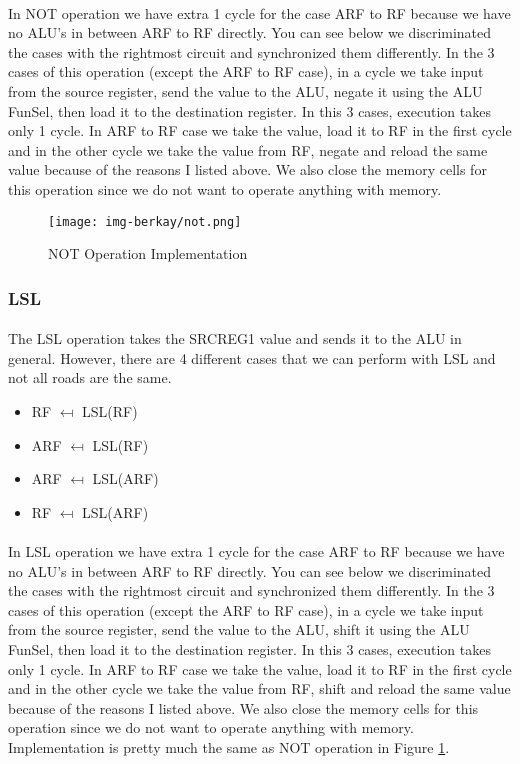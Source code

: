\documentclass{article}
\begin{document}
\paragraph{}
In NOT operation we have extra 1 cycle for the case ARF to RF because we have no ALU's in between ARF to RF directly. You can see below we discriminated the cases with the rightmost circuit and synchronized them differently. In the 3 cases of this operation (except the ARF to RF case), in a cycle we take input from the source register, send the value to the ALU, negate it using the ALU FunSel, then load it to the destination register. In this 3 cases, execution takes only 1 cycle. In ARF to RF case we take the value, load it to RF in the first cycle and in the other cycle we take the value from RF, negate and reload the same value because of the reasons I listed above. We also close the memory cells for this operation since we do not want to operate anything with memory.

\begin{figure}[h]
    \centering
    \texttt{[image: img-berkay/not.png]}
    \caption{NOT Operation Implementation}
    \label{fig:not}
\end{figure}
\newpage
\subsubsection{LSL}
\paragraph{}
The LSL operation takes the SRCREG1 value and sends it to the ALU in general. However, there are 4 different cases that we can perform with LSL and not all  roads are the same.
\begin{itemize}
    \item RF $\mapsfrom$ LSL(RF)
    \item ARF $\mapsfrom$ LSL(RF)
    \item ARF $\mapsfrom$ LSL(ARF)
    \item RF $\mapsfrom$ LSL(ARF)
\end{itemize}

\paragraph{}
In LSL operation we have extra 1 cycle for the case ARF to RF because we have no ALU's in between ARF to RF directly. You can see below we discriminated the cases with the rightmost circuit and synchronized them differently. In the 3 cases of this operation (except the ARF to RF case), in a cycle we take input from the source register, send the value to the ALU, shift it using the ALU FunSel, then load it to the destination register. In this 3 cases, execution takes only 1 cycle. In ARF to RF case we take the value, load it to RF in the first cycle and in the other cycle we take the value from RF, shift and reload the same value because of the reasons I listed above. We also close the memory cells for this operation since we do not want to operate anything with memory. Implementation is pretty much the same as NOT operation in Figure \ref{fig:not}.
\newpage
\end{document}
